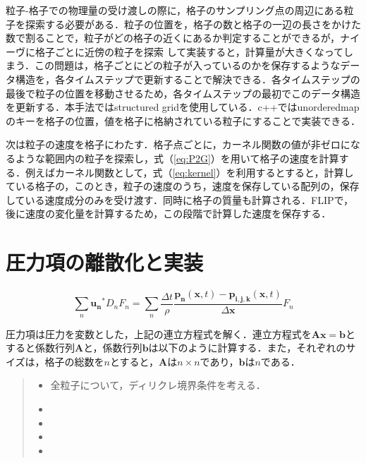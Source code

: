 \documentclass[a4j,12pt]{jreport}
\begin{document}
粒子-格子での物理量の受け渡しの際に，格子のサンプリング点の周辺にある粒子を探索する必要がある．粒子の位置を，格子の数と格子の一辺の長さをかけた数で割ることで，粒子がどの格子の近くにあるか判定することができるが，ナイーヴに格子ごとに近傍の粒子を探索
して実装すると，計算量が大きくなってしまう．この問題は，格子ごとにどの粒子が入っているのかを保存するようなデータ構造を，各タイムステップで更新することで解決できる．各タイムステップの最後で粒子の位置を移動させるため，各タイムステップの最初でこのデータ構造を更新する．本手法ではstructured gridを使用している．c++ではunorderedmapのキーを格子の位置，値を格子に格納されている粒子にすることで実装できる．

次は粒子の速度を格子にわたす．格子点ごとに，カーネル関数の値が非ゼロになるような範囲内の粒子を探索し，式（\ref{eq:P2G}）を用いて格子の速度を計算する．例えばカーネル関数として，式（\ref{eq:kernel}）を利用するとすると，計算している格子の，このとき，粒子の速度のうち，速度を保存している配列の，保存している速度成分のみを受け渡す．同時に格子の質量も計算される．FLIPで，後に速度の変化量を計算するため，この段階で計算した速度を保存する．

\section{圧力項の離散化と実装} \label{sec:Imppressure}
\begin{equation}\label{eq:discretized_pressure}
\sum_{n}\bm{u_n}^*D_nF_n= \sum_{n}\frac{\Delta t}{\rho}\frac{\bm{p_n}(\bm{x},t) - \bm{p_{i,j,k}}(\bm{x},t)}{\Delta \bm{x}}F_n
\end{equation}

圧力項は圧力を変数とした，上記の連立方程式を解く．連立方程式を$\bm{Ax=b}$とすると係数行列$\bm{A}$と，係数行列$\bm{b}$は以下のように計算する．また，それぞれのサイズは，格子の総数を$n$とすると，$\bm{A}$は$n \times n$であり，$\bm{b}$は$n$である．
\begin{quote}
	\begin{itemize}
		\item 全粒子について，ディリクレ境界条件を考える．
		\item 
		\item 
		\item 
		\item 
	\end{itemize}
\end{quote}
\end{document}
